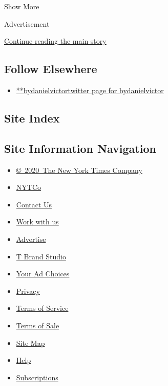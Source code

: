Show More

Advertisement

\protect\hyperlink{after-mid2}{Continue reading the main story}

\hypertarget{follow-elsewhere}{%
\subsection{Follow Elsewhere}\label{follow-elsewhere}}

\begin{itemize}
\tightlist
\item
  \href{https://twitter.com/bydanielvictor}{**bydanielvictortwitter page
  for bydanielvictor}
\end{itemize}

\hypertarget{site-index}{%
\subsection{Site Index}\label{site-index}}

\hypertarget{site-information-navigation}{%
\subsection{Site Information
Navigation}\label{site-information-navigation}}

\begin{itemize}
\tightlist
\item
  \href{https://help.nytimes3xbfgragh.onion/hc/en-us/articles/115014792127-Copyright-notice}{©~2020~The
  New York Times Company}
\end{itemize}

\begin{itemize}
\tightlist
\item
  \href{https://www.nytco.com/}{NYTCo}
\item
  \href{https://help.nytimes3xbfgragh.onion/hc/en-us/articles/115015385887-Contact-Us}{Contact
  Us}
\item
  \href{https://www.nytco.com/careers/}{Work with us}
\item
  \href{https://nytmediakit.com/}{Advertise}
\item
  \href{http://www.tbrandstudio.com/}{T Brand Studio}
\item
  \href{https://www.nytimes3xbfgragh.onion/privacy/cookie-policy\#how-do-i-manage-trackers}{Your
  Ad Choices}
\item
  \href{https://www.nytimes3xbfgragh.onion/privacy}{Privacy}
\item
  \href{https://help.nytimes3xbfgragh.onion/hc/en-us/articles/115014893428-Terms-of-service}{Terms
  of Service}
\item
  \href{https://help.nytimes3xbfgragh.onion/hc/en-us/articles/115014893968-Terms-of-sale}{Terms
  of Sale}
\item
  \href{https://spiderbites.nytimes3xbfgragh.onion}{Site Map}
\item
  \href{https://help.nytimes3xbfgragh.onion/hc/en-us}{Help}
\item
  \href{https://www.nytimes3xbfgragh.onion/subscription?campaignId=37WXW}{Subscriptions}
\end{itemize}
